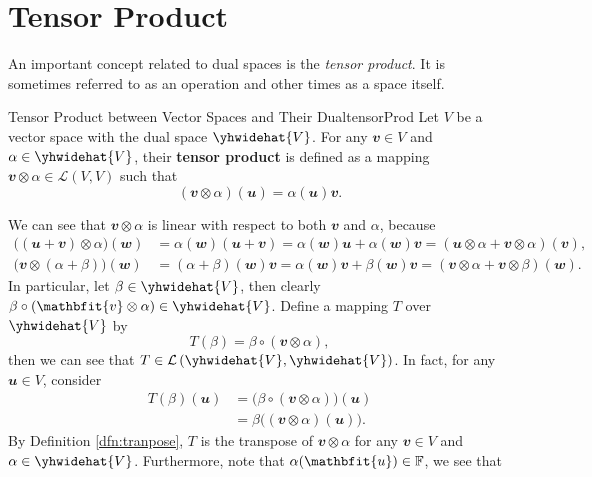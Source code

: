 \documentclass[math, code]{amznotes}
\theoremstyle{remark}
\begin{document}
\section{Tensor Product}
An important concept related to dual spaces is the \textit{tensor product}. It is sometimes referred to as an operation and other times as a space itself.
\begin{dfnbox}{Tensor Product between Vector Spaces and Their Dual}{tensorProd}
    Let $V$ be a vector space with the dual space $\yhwidehat{V}$. For any $\mathbfit{v} \in V$ and $\alpha \in \yhwidehat{V}$, their {\color{red} \textbf{tensor product}} is defined as a mapping $\mathbfit{v} \otimes \alpha \in \mathcal{L}(V, V)$ such that
    \begin{equation*}
        (\mathbfit{v} \otimes \alpha)(\mathbfit{u}) = \alpha(\mathbfit{u})\mathbfit{v}.
    \end{equation*}
\end{dfnbox}
We can see that $\mathbfit{v} \otimes \alpha$ is linear with respect to both $\mathbfit{v}$ and $\alpha$, because
\begin{align*}
    \bigl((\mathbfit{u + v}) \otimes \alpha\bigr)(\mathbfit{w}) & = \alpha(\mathbfit{w})(\mathbfit{u + v}) = \alpha(\mathbfit{w})\mathbfit{u} + \alpha(\mathbfit{w})\mathbfit{v} = (\mathbfit{u} \otimes \alpha + \mathbfit{v} \otimes \alpha)(\mathbfit{v}), \\
    \bigl(\mathbfit{v} \otimes (\alpha + \beta)\bigr)(\mathbfit{w}) & = (\alpha + \beta)(\mathbfit{w})\mathbfit{v} = \alpha(\mathbfit{w})\mathbfit{v} + \beta(\mathbfit{w})\mathbfit{v} = (\mathbfit{v} \otimes \alpha + \mathbfit{v} \otimes \beta)(\mathbfit{w}).
\end{align*}
In particular, let $\beta \in \yhwidehat{V}$, then clearly $\beta \circ (\mathbfit{v} \otimes \alpha) \in \yhwidehat{V}$. Define a mapping $T$ over $\yhwidehat{V}$ by
\begin{equation*}
    T(\beta) = \beta \circ (\mathbfit{v} \otimes \alpha),
\end{equation*}
then we can see that $T \in \mathcal{L}\left(\yhwidehat{V}, \yhwidehat{V}\right)$. In fact, for any $\mathbfit{u} \in V$, consider
\begin{align*}
    T(\beta)(\mathbfit{u}) & = \bigl(\beta \circ (\mathbfit{v} \otimes \alpha)\bigr)(\mathbfit{u}) \\
    & = \beta\bigl((\mathbfit{v} \otimes \alpha)(\mathbfit{u})\bigr).
\end{align*}
By Definition \ref{dfn:tranpose}, $T$ is the transpose of $\mathbfit{v} \otimes \alpha$ for any $\mathbfit{v} \in V$ and $\alpha \in \yhwidehat{V}$. Furthermore, note that $\alpha(\mathbfit{u}) \in \F$, we see that
\end{document}
